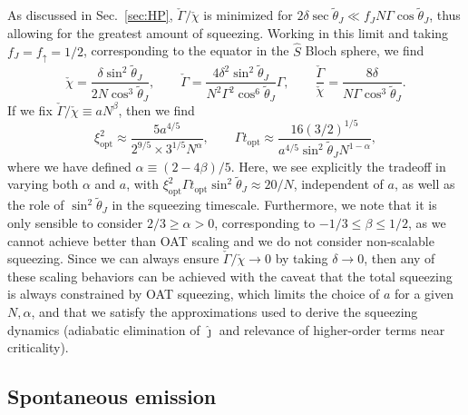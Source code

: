 \documentclass[11pt]{article}
\begin{document}
As discussed in Sec.~\ref{sec:HP}, $\check \Gamma/\check \chi$ is minimized for $2 \delta \sec \tilde{\theta}_J \ll f_J N \Gamma \cos \tilde{\theta}_J$, thus allowing for the greatest amount of squeezing. Working in this limit and taking $f_J = f_{\uparrow} = 1/2$, corresponding to the equator in the $\hat S$ Bloch sphere, we find
\begin{equation}
    \check{\chi} = \frac{ \delta \sin^2 \tilde{\theta}_J}{2 N \cos^3 \tilde{\theta}_J}, \qquad \check{\Gamma} = \frac{4 \delta^2 \sin^2 \tilde{\theta}_J}{N^2 \Gamma^2 \cos^6 \tilde{\theta}_J} \Gamma, \qquad \frac{\check{\Gamma}}{\check{\chi}} = \frac{8 \delta}{N \Gamma \cos^3 \tilde{\theta}_J}.
\end{equation}
If we fix $\check \Gamma/\check \chi \equiv a N^\beta$, then we find
\begin{equation}
    \xi^2_{\text{opt}} \approx \frac{ 5 a^{4/5}}{2^{9/5} \times 3^{1/5} N^{\alpha}}, \qquad \Gamma t_{\text{opt}} \approx \frac{16 (3/2)^{1/5}}{a^{4/5} \sin^2 \tilde{\theta}_J N^{1-\alpha}},
\end{equation}
where we have defined $\alpha \equiv (2-4 \beta)/5$. Here, we see explicitly the tradeoff in varying both $\alpha$ and $a$, with $\xi^2_{\text{opt}} \Gamma t_{\text{opt}} \sin^2 \tilde{\theta}_J \approx 20/N$, independent of $a$, as well as the role of $\sin^2 \tilde{\theta}_J$ in the squeezing timescale. Furthermore, we note that it is only sensible to consider $2/3 \geq \alpha > 0$, corresponding to $ -1/3 \leq \beta \leq 1/2$, as we cannot achieve better than OAT scaling and we do not consider non-scalable squeezing. Since we can always ensure $\check \Gamma/\check \chi \to 0$ by taking $\delta \to 0$, then any of these scaling behaviors can be achieved with the caveat that the total squeezing is always constrained by OAT squeezing, which limits the choice of $a$ for a given $N, \alpha$, and that we satisfy the approximations used to derive the squeezing dynamics (adiabatic elimination of $\hat \jmath$ and relevance of higher-order terms near criticality). 

\subsection{Spontaneous emission}
\label{sec:SE}
\end{document}
